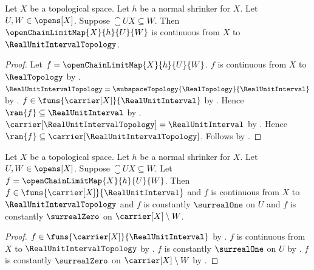 \begin{theorem}\label{open_chain_limit_map_continuous_unit_interval}
    Let $X$ be a topological space.
    Let $h$ be a normal shrinker for $X$.
    Let $U,W\in\opens[X]$.
    Suppose $\closure{U}{X}\subseteq W$.
    Then $\openChainLimitMap{X}{h}{U}{W}$ is continuous from
        $X$ to $\RealUnitIntervalTopology$.
\end{theorem}
\begin{proof}
    Let $f=\openChainLimitMap{X}{h}{U}{W}$.
    $f$ is continuous from $X$ to $\RealTopology$
        by .
    $\RealUnitIntervalTopology
        =\subspaceTopology{\RealTopology}{\RealUnitInterval}$
        by .
    $f\in\funs{\carrier[X]}{\RealUnitInterval}$
        by .
    Hence $\ran{f}\subseteq\RealUnitInterval$ by .
    $\carrier[\RealUnitIntervalTopology]=\RealUnitInterval$
        by .
    Hence $\ran{f}\subseteq\carrier[\RealUnitIntervalTopology]$.
    Follows by .
\end{proof}

\begin{theorem}\label{open_chain_limit_map_separates_nested_opens}
    Let $X$ be a topological space.
    Let $h$ be a normal shrinker for $X$.
    Let $U,W\in\opens[X]$.
    Suppose $\closure{U}{X}\subseteq W$.
    Let $f=\openChainLimitMap{X}{h}{U}{W}$.
    Then $f\in\funs{\carrier[X]}{\RealUnitInterval}$ and
        $f$ is continuous from $X$ to $\RealUnitIntervalTopology$ and
        $f$ is constantly $\surrealOne$ on $U$ and
        $f$ is constantly $\surrealZero$ on $\carrier[X]\setminus W$.
\end{theorem}
\begin{proof}
    $f\in\funs{\carrier[X]}{\RealUnitInterval}$
        by .
    $f$ is continuous from $X$ to $\RealUnitIntervalTopology$
        by .
    $f$ is constantly $\surrealOne$ on $U$
        by .
    $f$ is constantly $\surrealZero$ on $\carrier[X]\setminus W$
        by .
\end{proof}

